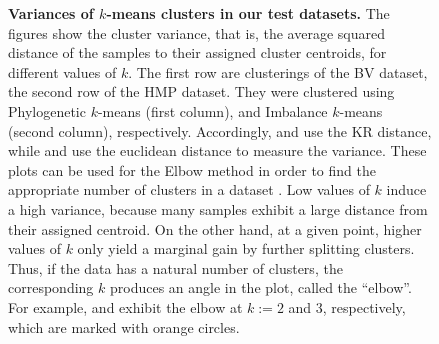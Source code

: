 \begin{figure}[hpbt]
    \centering
    \begin{subfigure}{0pt}
        \label{fig:elbows:sub:bv_phylo}
    \end{subfigure}
    \begin{subfigure}{0pt}
        \label{fig:elbows:sub:bv_imb}
    \end{subfigure}
    \begin{subfigure}{0pt}
        \label{fig:elbows:sub:hmp_phylo}
    \end{subfigure}
    \begin{subfigure}{0pt}
        \label{fig:elbows:sub:hmp_imb}
    \end{subfigure}
    \caption[Variances of $k$-means clusters in our test datasets]{
        \textbf{Variances of $k$-means clusters in our test datasets.}
        The figures show the cluster variance,
        that is, the average squared distance of the samples to their assigned cluster centroids,
        for different values of $k$.
        The first row are clusterings of the BV dataset, the second row of the HMP dataset.
        They were clustered using Phylogenetic $k$-means (first column),
        and Imbalance $k$-means (second column), respectively.
        Accordingly,  and  use the KR distance,
        while  and  use the euclidean distance
        to measure the variance.
        These plots can be used for the Elbow method
        in order to find the appropriate number of clusters in a dataset \cite{Thorndike1953}.
        Low values of $k$ induce a high variance, because many samples exhibit a large distance from their assigned centroid.
        On the other hand, at a given point, higher values of $k$ only yield a marginal gain by further splitting clusters.
        Thus, if the data has a natural number of clusters, the corresponding $k$ produces an angle in the plot,
        called the ``elbow''.
        \\
        For example,  and 
        exhibit the elbow at $k:=2$ and $3$, respectively, which are marked with orange circles.
}
\end{figure}
